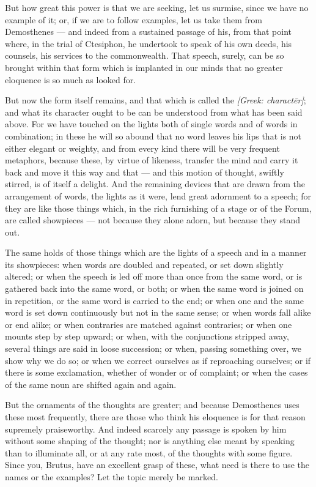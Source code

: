  But how great this power is that we are seeking, let us surmise, since we have no example of it; or, if we are to follow examples, let us take them from Demosthenes — and indeed from a sustained passage of his, from that point where, in the trial of Ctesiphon, he undertook to speak of his own deeds, his counsels, his services to the commonwealth. That speech, surely, can be so brought within that form which is implanted in our minds that no greater eloquence is so much as looked for.

 But now the form itself remains, and that which is called the \textit{[Greek: charactēr]}; and what its character ought to be can be understood from what has been said above. For we have touched on the lights both of single words and of words in combination; in these he will so abound that no word leaves his lips that is not either elegant or weighty, and from every kind there will be very frequent metaphors, because these, by virtue of likeness, transfer the mind and carry it back and move it this way and that — and this motion of thought, swiftly stirred, is of itself a delight. And the remaining devices that are drawn from the arrangement of words, the lights as it were, lend great adornment to a speech; for they are like those things which, in the rich furnishing of a stage or of the Forum, are called showpieces — not because they alone adorn, but because they stand out.

 The same holds of those things which are the lights of a speech and in a manner its showpieces: when words are doubled and repeated, or set down slightly altered; or when the speech is led off more than once from the same word, or is gathered back into the same word, or both; or when the same word is joined on in repetition, or the same word is carried to the end; or when one and the same word is set down continuously but not in the same sense; or when words fall alike or end alike; or when contraries are matched against contraries; or when one mounts step by step upward; or when, with the conjunctions stripped away, several things are said in loose succession; or when, passing something over, we show why we do so; or when we correct ourselves as if reproaching ourselves; or if there is some exclamation, whether of wonder or of complaint; or when the cases of the same noun are shifted again and again.

 But the ornaments of the thoughts are greater; and because Demosthenes uses these most frequently, there are those who think his eloquence is for that reason supremely praiseworthy. And indeed scarcely any passage is spoken by him without some shaping of the thought; nor is anything else meant by speaking than to illuminate all, or at any rate most, of the thoughts with some figure. Since you, Brutus, have an excellent grasp of these, what need is there to use the names or the examples? Let the topic merely be marked.


